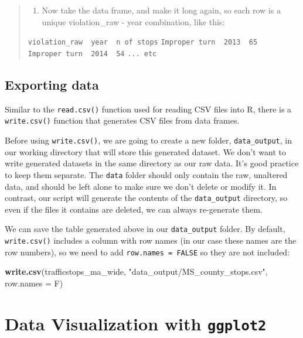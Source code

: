 \documentclass[]{book}
\newenvironment{Shaded}{\begin{snugshade}}{\end{snugshade}}
\newcommand{\DataTypeTok}[1]{\textcolor[rgb]{0.13,0.29,0.53}{#1}}
\newcommand{\KeywordTok}[1]{\textcolor[rgb]{0.13,0.29,0.53}{\textbf{#1}}}
\newcommand{\NormalTok}[1]{#1}
\newcommand{\StringTok}[1]{\textcolor[rgb]{0.31,0.60,0.02}{#1}}
\providecommand{\tightlist}{%
  \setlength{\itemsep}{0pt}\setlength{\parskip}{0pt}}
\begin{document}
\begin{quote}
\begin{enumerate}
\def\labelenumi{\arabic{enumi}.}
\setcounter{enumi}{1}
\tightlist
\item
  Now take the data frame, and make it long again, so each row is a
  unique violation\_raw - year combination, like this:
\end{enumerate}

\texttt{violation\_raw\ \textbar{}\ year\ \textbar{}\ n\ of\ stops}
\texttt{Improper\ turn\ \textbar{}\ 2013\ \textbar{}\ 65}
\texttt{Improper\ turn\ \textbar{}\ 2014\ \textbar{}\ 54}
\texttt{...\ etc}
\end{quote}

\hypertarget{exporting-data}{%
\section{Exporting data}\label{exporting-data}}

Similar to the \texttt{read.csv()} function used for reading CSV files into R, there is a \texttt{write.csv()} function that generates CSV files from data frames.

Before using \texttt{write.csv()}, we are going to create a new folder, \texttt{data\_output},
in our working directory that will store this generated dataset. We don't want
to write generated datasets in the same directory as our raw data. It's good
practice to keep them separate. The \texttt{data} folder should only contain the raw,
unaltered data, and should be left alone to make sure we don't delete or modify
it. In contrast, our script will generate the contents of the \texttt{data\_output}
directory, so even if the files it contains are deleted, we can always
re-generate them.

We can save the table generated above in our \texttt{data\_output}
folder. By default, \texttt{write.csv()} includes a column with row names (in our case
these names are the row numbers), so we need to add \texttt{row.names\ =\ FALSE} so
they are not included:

\begin{Shaded}
\begin{Highlighting}[]
\KeywordTok{write.csv}\NormalTok{(trafficstops_ma_wide, }\StringTok{"data_output/MS_county_stops.csv"}\NormalTok{, }\DataTypeTok{row.names =}\NormalTok{ F)}
\end{Highlighting}
\end{Shaded}

\hypertarget{data-visualization-with-ggplot2}{%
\chapter{\texorpdfstring{Data Visualization with \texttt{ggplot2}}{Data Visualization with ggplot2}}\label{data-visualization-with-ggplot2}}
\end{document}
